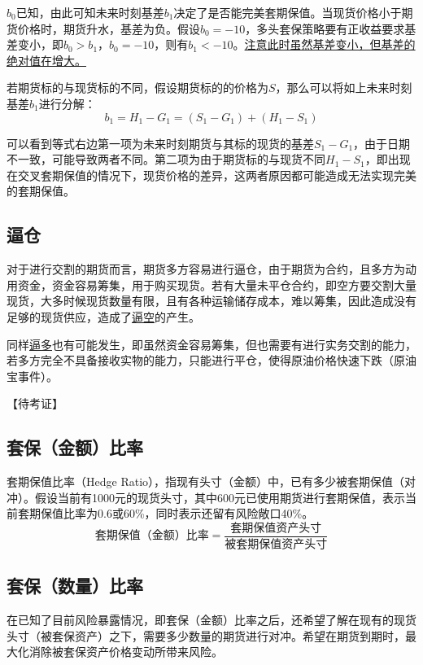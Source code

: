 \documentclass[11pt]{article}
\begin{document}
$b_0$已知，由此可知未来时刻基差$b_1$决定了是否能完美套期保值。当现货价格小于期货价格时，期货升水，基差为负。假设$b_0=-10$，多头套保策略要有正收益要求基差变小，即$b_0>b_1$，$b_0=-10$，则有$b_1< -10$。\uline{注意此时虽然基差变小，但基差的绝对值在增大。}

若期货标的与现货标的不同，假设期货标的的价格为$S$，那么可以将如上未来时刻基差$b_1$进行分解：
\begin{equation*}
    b_1 = H_1 - G_1 = (S_1 - G_1) + (H_1 - S_1)
\end{equation*}

可以看到等式右边第一项为未来时刻期货与其标的现货的基差$S_1 - G_1$，由于日期不一致，可能导致两者不同。第二项为由于期货标的与现货不同$H_1 - S_1$，即出现在交叉套期保值的情况下，现货价格的差异，这两者原因都可能造成无法实现完美的套期保值。

\subsection*{逼仓}

对于进行交割的期货而言，期货多方容易进行逼仓，由于期货为合约，且多方为动用资金，资金容易筹集，用于购买现货。若有大量未平仓合约，即空方要交割大量现货，大多时候现货数量有限，且有各种运输储存成本，难以筹集，因此造成没有足够的现货供应，造成了\uline{逼空}的产生。

同样\uline{逼多}也有可能发生，即虽然资金容易筹集，但也需要有进行实务交割的能力，若多方完全不具备接收实物的能力，只能进行平仓，使得原油价格快速下跌（原油宝事件）。

【待考证】

\subsection{套保（金额）比率}

套期保值比率（Hedge Ratio），指现有头寸（金额）中，已有多少被套期保值（对冲）。假设当前有1000元的现货头寸，其中600元已使用期货进行套期保值，表示当前套期保值比率为0.6或60\%，同时表示还留有风险敞口40\%。
\begin{equation*}
   \text{套期保值（金额）比率} = \frac{\text{套期保值资产头寸}}{\text{被套期保值资产头寸}}
\end{equation*}

\subsection{套保（数量）比率}

在已知了目前风险暴露情况，即套保（金额）比率之后，还希望了解在现有的现货头寸（被套保资产）之下，需要多少数量的期货进行对冲。希望在期货到期时，最大化消除被套保资产价格变动所带来风险。
\end{document}
